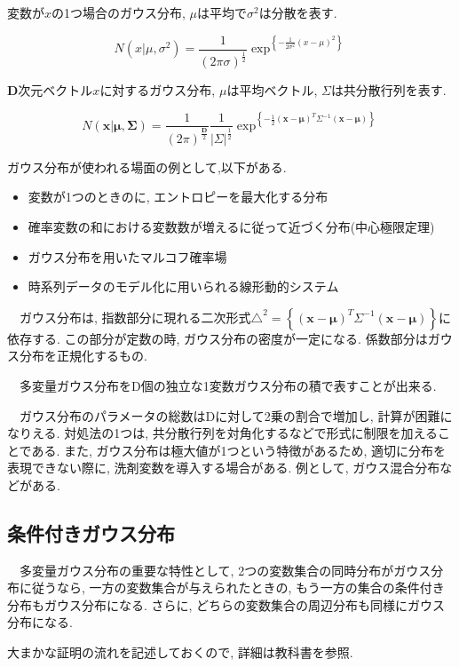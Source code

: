 変数が$x$の1つ場合のガウス分布, $\mu$は平均で$\sigma^{2}$は分散を表す.

$$ N\left({x|\mu,\sigma^{2}}\right) = \frac{1}{\left(2\pi\sigma\right)^\frac{1}{2}}\exp^{\left\{{-\frac{1}{2\sigma^{2}}\left(x-\mu\right)^{2}}\right\}} $$

$\bm{D}$次元ベクトル$x$に対するガウス分布, $\mu$は平均ベクトル, $\Sigma$は共分散行列を表す.

$$ N\left(\bm{x|\mu,\Sigma}\right) = \frac{1}{\left(2\pi\right)^\frac{\bm{D}}{2}}\frac{1}{\left|\Sigma\right|^\frac{1}{2}}\exp^{\left\{{-\frac{1}{2}\left(\bm{x}-\bm{\mu}\right)^{T}\Sigma^{-1}\left(\bm{x}-\bm{\mu}\right)}\right\}} $$

ガウス分布が使われる場面の例として,以下がある.
\begin{itemize}
  \item 変数が1つのときのに, エントロピーを最大化する分布
  \item 確率変数の和における変数数が増えるに従って近づく分布(中心極限定理)
  \item ガウス分布を用いたマルコフ確率場
  \item 時系列データのモデル化に用いられる線形動的システム
\end{itemize}

　ガウス分布は, 指数部分に現れる二次形式$ \triangle^2 = {\left\{{\left(\bm{x}-\bm{\mu}\right)^{T}\Sigma^{-1}\left(\bm{x}-\bm{\mu}\right)}\right\}} $に依存する. この部分が定数の時, ガウス分布の密度が一定になる.
係数部分はガウス分布を正規化するもの.

　多変量ガウス分布をD個の独立な1変数ガウス分布の積で表すことが出来る.

　ガウス分布のパラメータの総数はDに対して2乗の割合で増加し, 計算が困難になりえる. 対処法の1つは, 共分散行列を対角化するなどで形式に制限を加えることである. また, ガウス分布は極大値が1つという特徴があるため, 適切に分布を表現できない際に, 洗剤変数を導入する場合がある. 例として, ガウス混合分布などがある.

\subsection{条件付きガウス分布}
　多変量ガウス分布の重要な特性として, 2つの変数集合の同時分布がガウス分布に従うなら, 一方の変数集合が与えられたときの, もう一方の集合の条件付き分布もガウス分布になる. さらに, どちらの変数集合の周辺分布も同様にガウス分布になる. 

大まかな証明の流れを記述しておくので, 詳細は教科書を参照.

